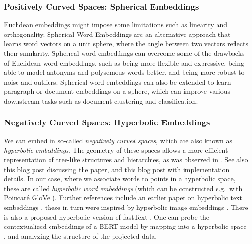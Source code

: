 \documentclass[11pt, a4paper]{amsart}
\begin{document}
\subsubsection{Positively Curved Spaces: Spherical Embeddings}

Euclidean embeddings might impose some limitations such as linearity and orthogonality.
Spherical Word Embeddings \cite{Meng2019SphericalTE} are an alternative approach that learns word vectors on a unit sphere, where the angle between two vectors reflects their similarity.
Spherical word embeddings can overcome some of the drawbacks of Euclidean word embeddings, such as being more flexible and expressive, being able to model antonyms and polysemous words better, and being more robust to noise and outliers.
Spherical word embeddings can also be extended to learn paragraph or document embeddings on a sphere, which can improve various downstream tasks such as document clustering and classification.

\subsubsection{Negatively Curved Spaces: Hyperbolic Embeddings}

We can embed in so-called \emph{negatively curved spaces}, which are also known as \emph{hyperbolic embeddings}.
The geometry of these spaces allows a more efficient representation of tree-like structures and hierarchies, as was observed in \cite{DBLP:journals/corr/NickelK17}.
See also this \href{https://bjlkeng.github.io/posts/hyperbolic-geometry-and-poincare-embeddings/}{blog post} discussing the paper, and \href{https://rare-technologies.com/implementing-poincare-embeddings/}{this blog post} with implementation details.
In our case, where we associate words to points in a hyperbolic space, these are called \emph{hyperbolic word embeddings} (which can be constructed e.g.\ with Poincar{\'e} GloVe \cite{DBLP:journals/corr/abs-1810-06546}).
Further references include an earlier paper on hyperbolic text embeddings \cite{DBLP:journals/corr/abs-1806-04313},
these in turn were inspired by hyperbolic image embeddings \cite{DBLP:journals/corr/abs-1904-02239}.
There is also a proposed hyperbolic version of fastText \cite{zhu-etal-2020-hypertext}.
One can probe the contextualized embeddings of a BERT model by mapping into a hyperbolic space \cite{DBLP:journals/corr/abs-2104-03869}, and analyzing the structure of the projected data.

\end{document}
